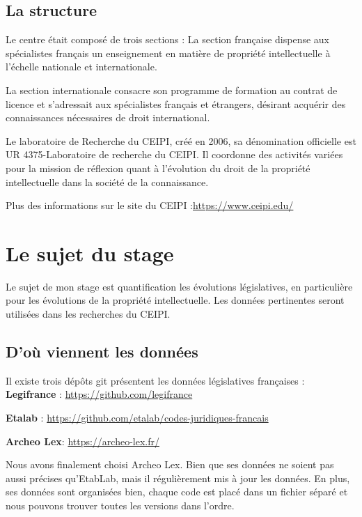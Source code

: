 \documentclass[
  oneside]{book}
\begin{document}
\hypertarget{la-structure}{%
\section{La structure}\label{la-structure}}

Le centre était composé de trois sections :
La section française dispense aux spécialistes français un enseignement en matière de propriété intellectuelle à l'échelle nationale et internationale.

La section internationale consacre son programme de formation au contrat de licence et s'adressait aux spécialistes français et étrangers, désirant acquérir des connaissances nécessaires de droit international.

Le laboratoire de Recherche du CEIPI, créé en 2006, sa dénomination officielle est UR 4375-Laboratoire de recherche du CEIPI. Il coordonne des activités variées pour la mission de réflexion quant à l'évolution du droit de la propriété intellectuelle dans la société de la connaissance.

Plus des informations sur le site du CEIPI :\url{https://www.ceipi.edu/}

\hypertarget{Sujet}{%
\chapter{Le sujet du stage}\label{Sujet}}

Le sujet de mon stage est quantification les évolutions législatives, en particulière pour les évolutions de la propriété intellectuelle. Les données pertinentes seront utilisées dans les recherches du CEIPI.

\hypertarget{douxf9-viennent-les-donnuxe9es}{%
\section{D'où viennent les données}\label{douxf9-viennent-les-donnuxe9es}}

Il existe trois dépôts git présentent les données législatives françaises :
\textbf{Legifrance} : \url{https://github.com/legifrance}

\textbf{Etalab} : \url{https://github.com/etalab/codes-juridiques-francais}

\textbf{Archeo Lex}: \url{https://archeo-lex.fr/}

Nous avons finalement choisi Archeo Lex. Bien que ses données ne soient pas aussi précises qu'EtabLab, mais il régulièrement mis à jour les données. En plus, ses données sont organisées bien, chaque code est placé dans un fichier séparé et nous pouvons trouver toutes les versions dans l'ordre.
\end{document}
